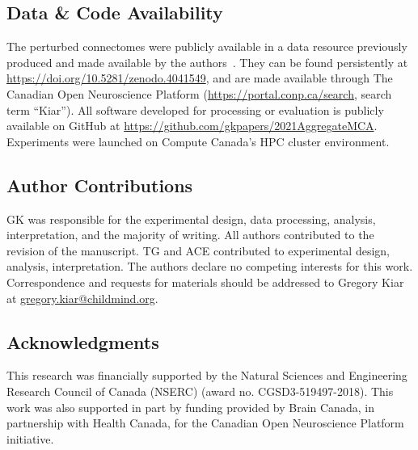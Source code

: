\documentclass[10pt]{SelfArx} %
\begin{document}
\subsection*{Data \& Code Availability}
The perturbed connectomes were publicly available in a data resource previously produced and made available by the
authors~\cite{Kiar2020-yz}. They can be found persistently at \url{https://doi.org/10.5281/zenodo.4041549}, and are
made available through The Canadian Open Neuroscience Platform (\url{https://portal.conp.ca/search}, search term
``Kiar''). All software developed for processing or evaluation is publicly available on GitHub at
\url{https://github.com/gkpapers/2021AggregateMCA}. Experiments were launched on Compute Canada's HPC cluster
environment.

\subsection*{Author Contributions}
GK was responsible for the experimental design, data processing, analysis, interpretation, and the majority of writing.
All authors contributed to the revision of the manuscript. TG and ACE contributed to experimental design, analysis,
interpretation. The authors declare no competing interests for this work. Correspondence and requests for materials
should be addressed to Gregory Kiar at \url{gregory.kiar@childmind.org}.

\subsection*{Acknowledgments} 
This research was financially supported by the Natural Sciences and Engineering Research Council of Canada (NSERC)
(award no. CGSD3-519497-2018). This work was also supported in part by funding provided by Brain Canada, in partnership
with Health Canada, for the Canadian Open Neuroscience Platform initiative.



\end{document}
